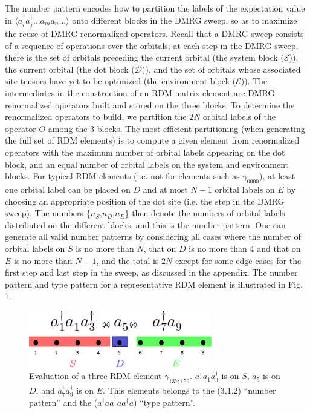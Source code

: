 The number pattern encodes how to partition the labels of the expectation value in $\langle a^\dagger_i a^\dagger_j\dots a_m a_n\dots \rangle$ onto different blocks in the DMRG sweep, so as to maximize the reuse of DMRG renormalized operators.
Recall that a DMRG sweep consists of a sequence of operations over the orbitals; at each step in the DMRG sweep, there is the set of
orbitals preceding the current orbital (the system block ($\mathcal{S}$)), the current orbital (the dot block ($\mathcal{D}$)), and the set of orbitals whose
associated site tensors have yet to be optimized (the environment block ($\mathcal{E}$)). 
The intermediates in the construction of an RDM matrix element are DMRG renormalized operators  built and stored on the three blocks. 
To determine the renormalized operators to build, we partition the $2N$ orbital labels of the operator ${O}$ 
among the 3 blocks. The most efficient partitioning (when generating
the full set of RDM elements) is to compute a given element from renormalized operators with
the maximum number of orbital labels appearing on the dot block, and an
equal number of  orbital labels on the system and environment blocks. 
For typical RDM elements (i.e. not for elements such as $\gamma_{0000}$), at least one orbital label can be placed on $D$ and at most $N-1$ orbital labels on $E$ by choosing an appropriate position of the dot site (i.e. the step in the DMRG sweep). 
The numbers \{$n_S$,$n_D$,$n_E$\} then denote the numbers of orbital labels distributed on the different blocks, and this
is the number pattern. One can generate all valid number patterns by considering all cases where the number of orbital labels on $S$ is no more than $N$, that on $D$ is no more than 4 and that on $E$ is no more than $N-1$, and the total is $2N$ except for some edge cases for the first step and last step in the sweep, as discussed in the appendix.
The number pattern and type pattern for a representative RDM element is illustrated in Fig. \ref{fig:operator_split}. 


\begin{figure}\label{fig:operator_split}
  \includegraphics[width=8cm]{operator_split.eps}
  \caption{Evaluation of a three RDM element $\gamma_{137;159}$. $a_1^\dagger a_1 a^\dagger_3$ is on $S$, $a_5$ is on $D$, and $a^\dagger_7a^\dagger_9$ is on $E$. This elements belongs to the (3,1,2) ``number pattern'' and the ($a^\dagger a a^\dagger a a^\dagger a$) ``type pattern''.}
\end{figure}

